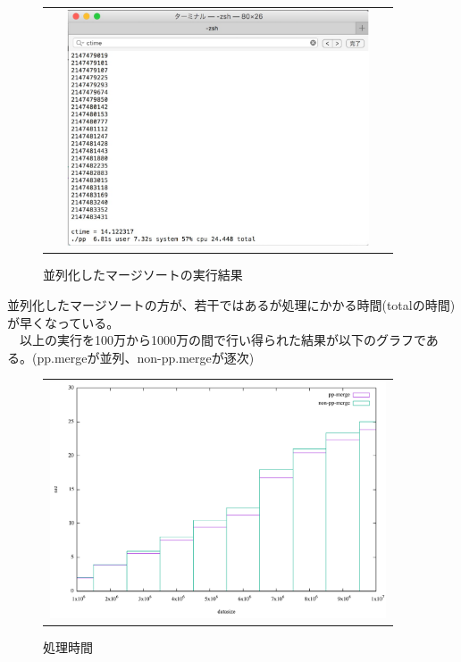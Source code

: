 \documentclass[11pt,a4paper]{jsarticle}
\begin{document}
\newpage
\begin{figure}[htbp]
 \begin{tabular}{c}
  \begin{minipage}{0.5\hsize}
   \begin{center}
   \includegraphics[width=10cm,height=7cm]{pp-crop.pdf}
   \caption{並列化したマージソートの実行結果}
   \end{center}
  \end{minipage}
 \end{tabular}
\end{figure}
並列化したマージソートの方が、若干ではあるが処理にかかる時間(totalの時間)が早くなっている。\\
　以上の実行を100万から1000万の間で行い得られた結果が以下のグラフである。(pp.mergeが並列、non-pp.mergeが逐次)
\begin{figure}[htbp]
 \begin{tabular}{c}
  \begin{minipage}{0.5\hsize}
   \begin{center}
   \includegraphics[width=10cm,height=7cm,angle=0]{total_graph.pdf}
   \caption{処理時間}
   \end{center}
  \end{minipage}
 \end{tabular}
\end{figure}
\end{document}
